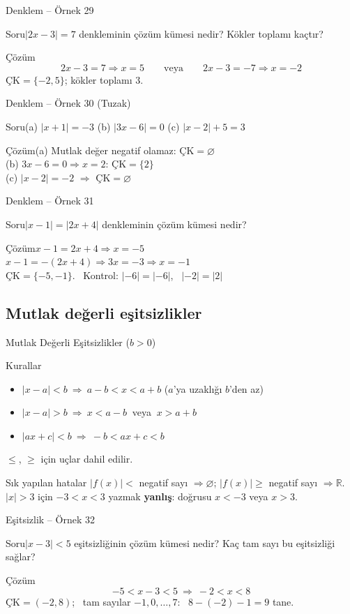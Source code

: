 \documentclass[aspectratio=169,11pt,handout]{beamer}
\newcommand{\soru}[3]{%
\begin{frame}{#1}
  \begin{block}{Soru}\large #2\end{block}
  \pause
  \begin{exampleblock}{Çözüm}\large #3\end{exampleblock}
\end{frame}}
\begin{document}
\soru{Denklem -- Örnek 29}
{\(|2x-3|=7\) denkleminin çözüm kümesi nedir? Kökler toplamı kaçtır?}
{\[2x-3=7\Rightarrow x=5\qquad\text{veya}\qquad 2x-3=-7\Rightarrow x=-2\]
\(\text{ÇK}=\{-2,5\}\); \quad kökler toplamı \(3\).}

\soru{Denklem -- Örnek 30 (Tuzak)}
{(a) \(|x+1|=-3\) \qquad (b) \(|3x-6|=0\) \qquad (c) \(|x-2|+5=3\)}
{(a) Mutlak değer negatif olamaz: \(\text{ÇK}=\varnothing\)\\[3pt]
(b) \(3x-6=0\Rightarrow x=2\): \(\text{ÇK}=\{2\}\)\\[3pt]
(c) \(|x-2|=-2\) \(\Rightarrow\) \(\text{ÇK}=\varnothing\)}

\soru{Denklem -- Örnek 31}
{\(|x-1|=|2x+4|\) denkleminin çözüm kümesi nedir?}
{\(x-1=2x+4\Rightarrow x=-5\)\\[2pt]
\(x-1=-(2x+4)\Rightarrow 3x=-3\Rightarrow x=-1\)\\[3pt]
\(\text{ÇK}=\{-5,-1\}\). \ Kontrol: \(|-6|=|-6|\), \ \(|-2|=|2|\) \ \checkmark}

\subsection{Mutlak değerli eşitsizlikler}
\begin{frame}{Mutlak Değerli Eşitsizlikler (\(b>0\))}
\begin{block}{Kurallar}
\begin{itemize}
\item \(|x-a|<b\ \Rightarrow\ a-b<x<a+b\) \quad (\(a\)'ya uzaklığı \(b\)'den az)
\item \(|x-a|>b\ \Rightarrow\ x<a-b\ \) veya \(\ x>a+b\)
\item \(|ax+c|<b\ \Rightarrow\ -b<ax+c<b\)
\end{itemize}
\(\le\), \(\ge\) için uçlar dahil edilir.
\end{block}
\begin{alertblock}{Sık yapılan hatalar}
\(|f(x)|<\) negatif sayı \(\Rightarrow\varnothing\); \quad \(|f(x)|\ge\) negatif sayı \(\Rightarrow\mathbb{R}\).\\
\(|x|>3\) için \(-3<x<3\) yazmak \textbf{yanlış}: doğrusu \(x<-3\) veya \(x>3\).
\end{alertblock}
\end{frame}

\soru{Eşitsizlik -- Örnek 32}
{\(|x-3|<5\) eşitsizliğinin çözüm kümesi nedir? Kaç tam sayı bu eşitsizliği sağlar?}
{\[-5<x-3<5\ \Rightarrow\ -2<x<8\]
\(\text{ÇK}=(-2,8)\); \ tam sayılar \(-1,0,\dots,7\): \ \(8-(-2)-1=9\) tane.}
\end{document}
